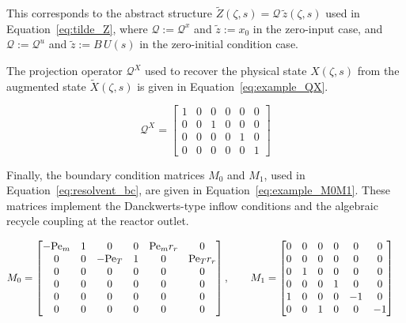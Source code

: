 This corresponds to the abstract structure $\tilde{Z}(\zeta, s) = \mathcal{Q}\, \tilde{z}(\zeta, s)$ used in Equation~\ref{eq:tilde_Z}, where $\mathcal{Q} := \mathcal{Q}^x$ and $\tilde{z} := x_0$ in the zero-input case, and $\mathcal{Q} := \mathcal{Q}^u$ and $\tilde{z} := B\, U(s)$ in the zero-initial condition case.

The projection operator $\mathcal{Q}^X$ used to recover the physical state $X(\zeta, s)$ from the augmented state $\tilde{X}(\zeta, s)$ is given in Equation~\eqref{eq:example_QX}.

\begin{equation} \label{eq:example_QX}
\mathcal{Q}^X =
\begin{bmatrix}
1 & 0 & 0 & 0 & 0 & 0 \\
0 & 0 & 1 & 0 & 0 & 0 \\
0 & 0 & 0 & 0 & 1 & 0 \\
0 & 0 & 0 & 0 & 0 & 1
\end{bmatrix}
\end{equation}

Finally, the boundary condition matrices $M_0$ and $M_1$, used in Equation~\eqref{eq:resolvent_bc}, are given in Equation~\eqref{eq:example_M0M1}. These matrices implement the Danckwerts-type inflow conditions and the algebraic recycle coupling at the reactor outlet.

\begin{equation} \label{eq:example_M0M1}
\begin{aligned}
M_0 &= 
\begin{bmatrix}
-{\rm Pe}_m & 1 & 0 & 0 & {\rm Pe}_m r_r & 0 \\
0 & 0 & -{\rm Pe}_T & 1 & 0 & {\rm Pe}_T r_r \\
0 & 0 & 0 & 0 & 0 & 0 \\
0 & 0 & 0 & 0 & 0 & 0 \\
0 & 0 & 0 & 0 & 0 & 0 \\
0 & 0 & 0 & 0 & 0 & 0
\end{bmatrix}, \qquad
M_1 = 
\begin{bmatrix}
0 & 0 & 0 & 0 & 0 & 0 \\
0 & 0 & 0 & 0 & 0 & 0 \\
0 & 1 & 0 & 0 & 0 & 0 \\
0 & 0 & 0 & 1 & 0 & 0 \\
1 & 0 & 0 & 0 & -1 & 0 \\
0 & 0 & 1 & 0 & 0 & -1
\end{bmatrix}
\end{aligned}
\end{equation}

